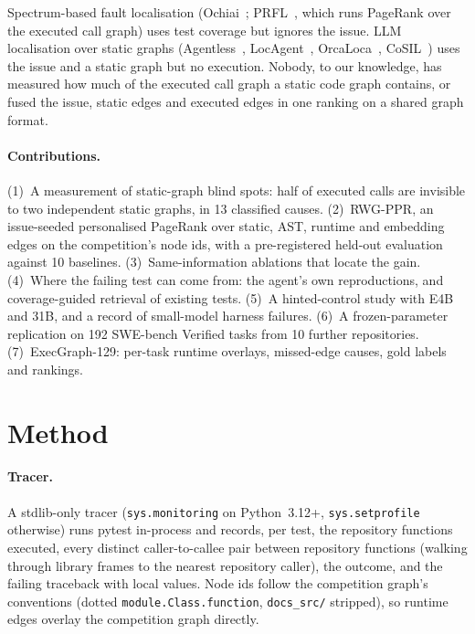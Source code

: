 \documentclass[10pt]{article}
\newcommand{\code}[1]{\texttt{#1}}
\begin{document}
Spectrum-based fault localisation (Ochiai~\cite{abreu2007ochiai}; PRFL~\cite{zhang2017prfl}, which runs PageRank over
the executed call graph) uses test coverage but ignores the issue. LLM localisation over static graphs
(Agentless~\cite{xia2024agentless}, LocAgent~\cite{chen2025locagent}, OrcaLoca~\cite{yu2025orcaloca},
CoSIL~\cite{jiang2025cosil}) uses the issue and a static graph but no execution. Nobody, to our knowledge, has measured
how much of the executed call graph a static code graph contains, or fused the issue, static edges and executed edges
in one ranking on a shared graph format.

\paragraph{Contributions.} (1)~A measurement of static-graph blind spots: half of executed calls are invisible to two
independent static graphs, in 13 classified causes. (2)~RWG-PPR, an issue-seeded personalised PageRank over static, AST,
runtime and embedding edges on the competition's node ids, with a pre-registered held-out evaluation against 10
baselines. (3)~Same-information ablations that locate the gain. (4)~Where the failing test can come from: the agent's
own reproductions, and coverage-guided retrieval of existing tests. (5)~A hinted-control study with E4B and 31B, and a
record of small-model harness failures. (6)~A frozen-parameter replication on 192 SWE-bench Verified tasks from 10
further repositories. (7)~ExecGraph-129: per-task runtime overlays, missed-edge causes, gold labels and rankings.

\section{Method}

\paragraph{Tracer.} A stdlib-only tracer (\code{sys.monitoring} on Python~3.12+, \code{sys.setprofile} otherwise) runs
pytest in-process and records, per test, the repository functions executed, every distinct caller-to-callee pair between
repository functions (walking through library frames to the nearest repository caller), the outcome, and the failing
traceback with local values. Node ids follow the competition graph's conventions (dotted \code{module.Class.function},
\code{docs\_src/} stripped), so runtime edges overlay the competition graph directly.
\end{document}
